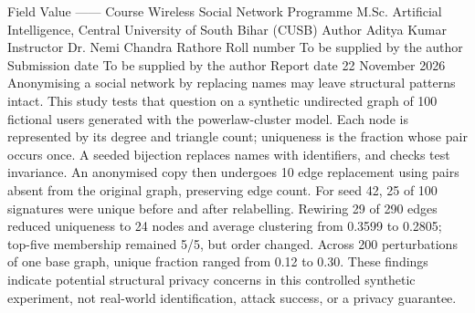 \markdownRendererDocumentBegin
\markdownRendererSectionBegin
{}\markdownRendererInterblockSeparator
{}\markdownRendererPipe{} Field \markdownRendererPipe{} Value \markdownRendererPipe{}\markdownRendererSoftLineBreak
{}\markdownRendererPipe{}---\markdownRendererPipe{}---\markdownRendererPipe{}\markdownRendererSoftLineBreak
{}\markdownRendererPipe{} Course \markdownRendererPipe{} Wireless Social Network \markdownRendererPipe{}\markdownRendererSoftLineBreak
{}\markdownRendererPipe{} Programme \markdownRendererPipe{} M.Sc. Artificial Intelligence, Central University of South Bihar (CUSB) \markdownRendererPipe{}\markdownRendererSoftLineBreak
{}\markdownRendererPipe{} Author \markdownRendererPipe{} Aditya Kumar \markdownRendererPipe{}\markdownRendererSoftLineBreak
{}\markdownRendererPipe{} Instructor \markdownRendererPipe{} Dr. Nemi Chandra Rathore \markdownRendererPipe{}\markdownRendererSoftLineBreak
{}\markdownRendererPipe{} Roll number \markdownRendererPipe{} To be supplied by the author \markdownRendererPipe{}\markdownRendererSoftLineBreak
{}\markdownRendererPipe{} Submission date \markdownRendererPipe{} To be supplied by the author \markdownRendererPipe{}\markdownRendererSoftLineBreak
{}\markdownRendererPipe{} Report date \markdownRendererPipe{} 22 November 2026 \markdownRendererPipe{}\markdownRendererInterblockSeparator
{}\markdownRendererSectionBegin
{}\markdownRendererInterblockSeparator
{}Anonymising a social network by replacing names may leave structural patterns intact. This study tests that question on a synthetic undirected graph of 100 fictional users generated with the powerlaw-cluster model. Each node is represented by its degree and triangle count; uniqueness is the fraction whose pair occurs once. A seeded bijection replaces names with identifiers, and checks test invariance. An anonymised copy then undergoes 10\markdownRendererPercentSign{} edge replacement using pairs absent from the original graph, preserving edge count. For seed 42, 25 of 100 signatures were unique before and after relabelling. Rewiring 29 of 290 edges reduced uniqueness to 24 nodes and average clustering from 0.3599 to 0.2805; top-five membership remained 5/5, but order changed. Across 200 perturbations of one base graph, unique fraction ranged from 0.12 to 0.30. These findings indicate potential structural privacy concerns in this controlled synthetic experiment, not real-world identification, attack success, or a privacy guarantee.\markdownRendererInterblockSeparator
